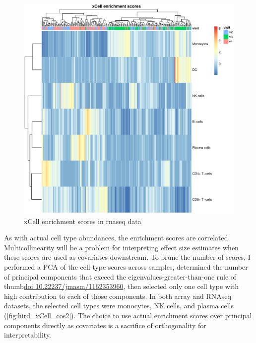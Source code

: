 \begin{figure}
    \centering
    \includegraphics[width=1.0\textwidth,page=1]{mainmatter/figures/chapter_03/get_xCell_estimates.dataset_rnaseq.plots.pdf}
    \caption{xCell enrichment scores in rnaseq data}
    \label{fig:hird_xCell_scores_heatmap_rnaseq}
\end{figure}

As with actual cell type abundances, the enrichment scores are correlated.
Multicollinearity will be a problem for interpreting effect size estimates when these scores are used as covariates downstream.
To prune the number of scores, I performed a \gls{PCA} of the cell type scores across samples,
determined the number of principal components that exceed the eigenvalues-greater-than-one rule of thumb\url{doi 10.22237/jmasm/1162353960},
then selected only one cell type with high contribution to each of those components.
In both array and \gls{RNAseq} datasets, the selected cell types were monocytes, \gls{NK} cells, and plasma cells (\autoref{fig:hird_xCell_cos2}).
The choice to use actual enrichment scores over principal components directly as covariates is a sacrifice of orthogonality for interpretability.

